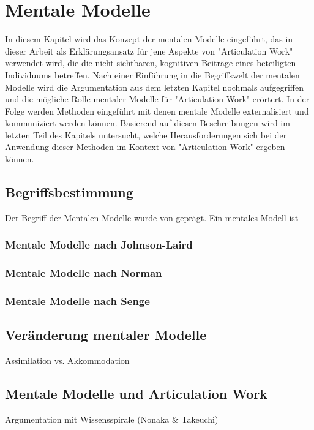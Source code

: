 \chapter{Mentale Modelle}
\label{cha:mentale_modelle}



In diesem Kapitel wird das Konzept der mentalen Modelle eingeführt, das in dieser Arbeit als Erklärungsansatz für jene Aspekte von "Articulation Work" verwendet wird, die die nicht sichtbaren, kognitiven Beiträge eines beteiligten Individuums betreffen. Nach einer Einführung in die Begriffswelt der mentalen Modelle wird die Argumentation aus dem letzten Kapitel nochmals aufgegriffen und die mögliche Rolle mentaler Modelle für "Articulation Work" erörtert. In der Folge werden Methoden eingeführt mit denen mentale Modelle externalisiert und kommuniziert werden können. Basierend auf diesen Beschreibungen wird im letzten Teil des Kapitels untersucht, welche Herausforderungen sich bei der Anwendung dieser Methoden im Kontext von "Articulation Work" ergeben können.

\section{Begriffsbestimmung}
\label{sec:mentalemodelle_begriffsbestimmung}

Der Begriff der Mentalen Modelle wurde von \citet{Johnson-Laird81} geprägt. Ein mentales Modell ist 

\subsection{Mentale Modelle nach Johnson-Laird} %
\label{sub:mentale_modelle_nach_johnson_laird}


\subsection{Mentale Modelle nach Norman} %
\label{sub:mentale_modelle_nach_norman}


\subsection{Mentale Modelle nach Senge} %
\label{sub:mentale_modelle_nach_senge}


\section{Veränderung mentaler Modelle}
\label{sub:veränderung_mentaler_modelle}
Assimilation vs. Akkommodation

\section{Mentale Modelle und Articulation Work}
\label{sec:mentale_modelle_und_articulation_work}

Argumentation mit Wissensspirale (Nonaka \& Takeuchi)

